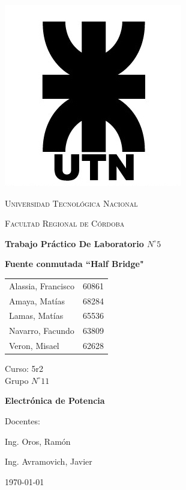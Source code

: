 \documentclass[11pt, a4paper]{article}
\begin{document}
\begin{titlepage}
 \centering
	\includegraphics[scale=0.80]{Imagenes/LOGO.jpg} \par
 	\vspace{1cm}
 	{\scshape\LARGE Universidad Tecnológica Nacional \par}
 	{\scshape\large Facultad Regional de Córdoba \par}
 	\vspace{1cm}
	{\bfseries \Large Trabajo Práctico De Laboratorio $N^{\circ} 5$\par}
	{\bfseries \Large Fuente conmutada ``Half Bridge" \par}
 	\vspace{1.5cm}

	\begin{tabular}{ll}
		Alassia, Francisco	&	60861	\\
		Amaya, Matías		&	68284	\\
		Lamas, Matías 		&	65536 	\\
		Navarro, Facundo 	&	63809 	\\
		Veron, Misael	 	&	62628
	\end{tabular}
	
	\vspace{1cm}
	Curso: 5r2 \\
	Grupo $N^{\circ} 11$
 	\vfill
	{\bfseries \Large Electrónica de Potencia \par}

	\vspace{1.5cm}
	Docentes: \par
	Ing. Oros, Ramón \par
	Ing. Avramovich, Javier \par

 	\vfill
	{\large \today\par}
\end{titlepage}
	
\end{document}
